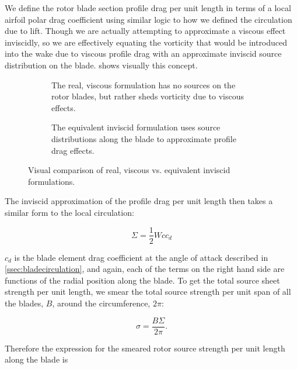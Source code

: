 We define the rotor blade section profile drag per unit length in terms of a local airfoil polar drag coefficient using similar logic to how we defined the circulation due to lift.
%
Though we are actually attempting to approximate a viscous effect inviscidly, so we are effectively equating the vorticity that would be introduced into the wake due to viscous profile drag with an approximate inviscid source distribution on the blade.
%
 shows visually this concept.
%
\begin{figure}[htb]
     \centering
     \begin{subfigure}[t]{0.45\textwidth}
        \centering
        
        \caption{The real, viscous formulation has no sources on the rotor blades, but rather sheds vorticity due to viscous effects.}
        \label{}
     \end{subfigure}
     \hfill
     \begin{subfigure}[t]{0.45\textwidth}
         \centering
        
        \caption{The equivalent inviscid formulation uses source distributions along the blade to approximate profile drag effects.}
        \label{}
     \end{subfigure}
     \caption{Visual comparison of real, viscous vs. equivalent inviscid formulations.}
    \label{fig:rvf_eif}
\end{figure}
%
The inviscid approximation of the profile drag per unit length then takes a similar form to the local circulation:

\begin{equation}
     \Sigma = \frac{1}{2} W c c_d
\end{equation}

\where \(c_d\) is the blade element drag coefficient at the angle of attack described in \cref{ssec:bladecirculation}, and again, each of the terms on the right hand side are functions of the radial position along the blade.
%
To get the total source sheet strength per unit length, we smear the total source strength per unit span of all the blades, \(B\), around the circumference, \(2\pi \):

\begin{equation}
    \sigma = \frac{B \Sigma}{2 \pi}.
\end{equation}

Therefore the expression for the smeared rotor source strength per unit length along the blade is

